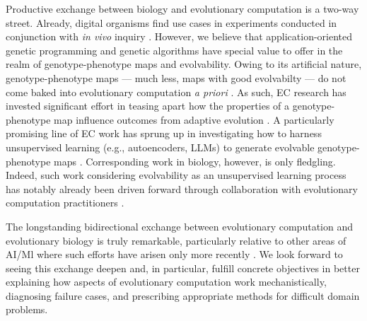 Productive exchange between biology and evolutionary computation is a two-way street.
Already, digital organisms find use cases in experiments conducted in conjunction with \textit{in vivo} inquiry \citep{sanjun2007selection,wilke2001evolution,hindr2012new}.
However, we believe that application-oriented genetic programming and genetic algorithms have special value to offer in the realm of genotype-phenotype maps and evolvability.
Owing to its artificial nature, genotype-phenotype maps --- much less, maps with good evolvabilty --- do not come baked into evolutionary computation \textit{a priori} \citep{kirschner1998evolvability}.
As such, EC research has invested significant effort in teasing apart how the properties of a genotype-phenotype map influence outcomes from adaptive evolution \citep{banzhaf1994genotype,hu2010evolvability,whigham2017mapping}.
A particularly promising line of EC work has sprung up in investigating how to harness unsupervised learning (e.g., autoencoders, LLMs) to generate evolvable genotype-phenotype maps \citep{moreno2018understanding,bradley2024openelm,wittenberg2023denoising,MORECITES}.
Corresponding work in biology, however, is only fledgling.
Indeed, such work considering evolvability as an unsupervised learning process has notably already been driven forward through collaboration with evolutionary computation practitioners \citep{kouvaris2017evolution,szilagyi2020phenotypes}.

The longstanding bidirectional exchange between evolutionary computation and evolutionary biology is truly remarkable, particularly relative to other areas of AI/Ml where such efforts have arisen only more recently \citep{marblestone2016toward,richards2019deep}.
We look forward to seeing this exchange deepen and, in particular, fulfill concrete objectives in better explaining how aspects of evolutionary computation work mechanistically, diagnosing failure cases, and prescribing appropriate methods for difficult domain problems.
